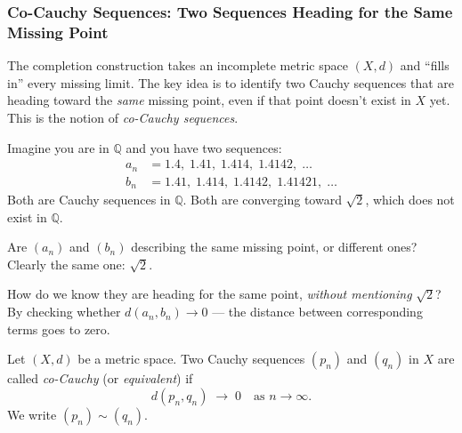 %

\subsubsection{Co-Cauchy Sequences: Two Sequences Heading for the Same Missing Point}
\label{sec:co-cauchy-intuition}

The completion construction takes an incomplete metric space $(X, d)$
and ``fills in'' every missing limit.
The key idea is to identify two Cauchy sequences that are heading
toward the \emph{same} missing point, even if that point doesn't exist in $X$ yet.
This is the notion of \emph{co-Cauchy sequences}.

\begin{remark*}
\label{rem:co-cauchy-intuition}
Imagine you are in $\mathbb{Q}$ and you have two sequences:
\begin{align*}
a_n &= 1.4,\; 1.41,\; 1.414,\; 1.4142,\; \ldots \\
b_n &= 1.41,\; 1.414,\; 1.4142,\; 1.41421,\; \ldots
\end{align*}
Both are Cauchy sequences in $\mathbb{Q}$.
Both are converging toward $\sqrt{2}$, which does not exist in $\mathbb{Q}$.

Are $(a_n)$ and $(b_n)$ describing the same missing point, or different ones?
Clearly the same one: $\sqrt{2}$.

How do we know they are heading for the same point, \emph{without mentioning} $\sqrt{2}$?
By checking whether $d(a_n, b_n) \to 0$ --- the distance between corresponding
terms goes to zero.
\end{remark*}

\begin{tcolorbox}[colback=propbox, colframe=propborder, arc=2pt,
  left=6pt, right=6pt, top=4pt, bottom=4pt,
  title={\small\textbf{Definition (Co-Cauchy Sequences)}},
  fonttitle=\small\bfseries]
\begin{definition}
\label{def:co-cauchy}
Let $(X,d)$ be a metric space.
Two Cauchy sequences $(p_n)$ and $(q_n)$ in $X$ are called
\emph{co-Cauchy} (or \emph{equivalent}) if
\[
d(p_n, q_n) \;\to\; 0
\quad\text{as } n \to \infty.
\]
We write $(p_n) \sim (q_n)$.
\end{definition}
\end{tcolorbox}


